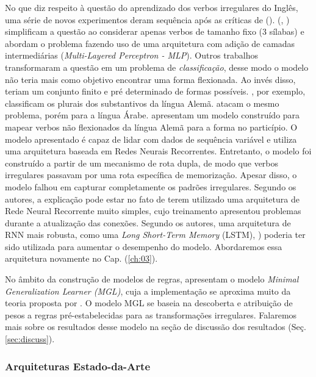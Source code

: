 No que diz respeito à questão do aprendizado dos verbos irregulares do Inglês, uma série de novos experimentos deram sequência após as críticas de (\cite{Pinker:1988}). (\cite{pluket:1991}, \citeyear{PLUNKETT:1993}) simplificam a questão ao considerar apenas verbos de tamanho fixo (3 sílabas) e abordam o problema fazendo uso de uma arquitetura com adição de camadas intermediárias (\textit{Multi-Layered Perceptron - MLP}). Outros trabalhos transformaram a questão em um problema de \textit{classificação}, desse modo o modelo não teria mais como objetivo encontrar uma forma flexionada. Ao invés disso, teriam um conjunto finito e pré determinado de formas possíveis. \cite{Nakisa1996WhereDD}, por exemplo, classificam os plurais dos substantivos da língua Alemã. \cite{plunkett:1997} atacam o mesmo problema, porém para a língua Árabe. \cite{wetermann:1997} apresentam um modelo construído para mapear verbos não flexionados da língua Alemã para a forma no particípio. O modelo apresentado é capaz de lidar com dados de sequência variável e utiliza uma arquitetura baseada em Redes Neurais Recorrentes. Entretanto, o modelo foi construído a partir de um mecanismo de rota dupla, de modo que verbos irregulares passavam por uma rota específica de memorização. Apesar disso, o modelo falhou em capturar completamente os padrões irregulares. Segundo os autores, a explicação pode estar no fato de terem utilizado uma arquitetura de Rede Neural Recorrente muito simples, cujo treinamento apresentou problemas durante a atualização das conexões. Segundo os autores, uma arquitetura de RNN mais robusta, como uma \textit{Long Short-Term Memory} (LSTM), \cite{hochreiter:1997}) poderia ter sido utilizada para aumentar o desempenho do modelo. Abordaremos essa arquitetura novamente no Cap. (\ref{ch:03}).

No âmbito da construção de modelos de regras, \cite{Albright2003RulesVA} apresentam o modelo \textit{Minimal Generalization Learner (MGL)}, cuja a implementação se aproxima muito da teoria proposta por \cite{Pinker:1988}. O modelo MGL se baseia na descoberta e atribuição de pesos a regras pré-estabelecidas para as transformações irregulares. Falaremos mais sobre os resultados desse modelo na seção de discussão dos resultados (Seç. \ref{sec:discuss}).

\subsubsection{Arquiteturas Estado-da-Arte}

